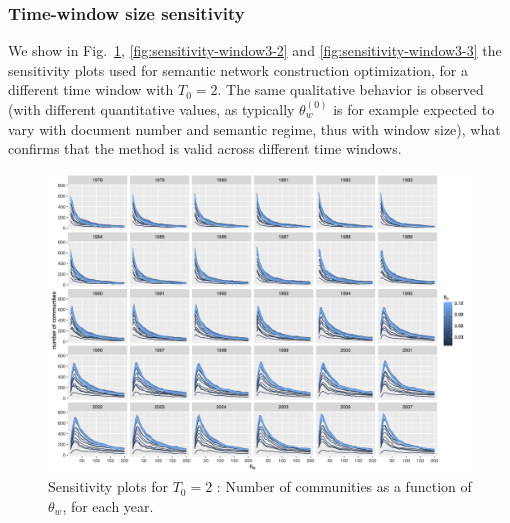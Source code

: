 \subsubsection*{Time-window size sensitivity}


We show in Fig.~\ref{fig:sensitivity-window3-1}, \ref{fig:sensitivity-window3-2} and \ref{fig:sensitivity-window3-3} the sensitivity plots used for semantic network construction optimization, for a different time window with $T_0 = 2$. The same qualitative behavior is observed (with different quantitative values, as typically $\theta_w^{(0)}$ is for example expected to vary with document number and semantic regime, thus with window size), what confirms that the method is valid across different time windows.


\begin{figure}
\centering
\includegraphics[width=\textheight,height=\textwidth,angle=90]{figures/commnum_thetaw_byyears_window3.png}
\caption{Sensitivity plots for $T_0 = 2$ : Number of communities as a function of $\theta_w$, for each year.}
\label{fig:sensitivity-window3-1}
\end{figure}


